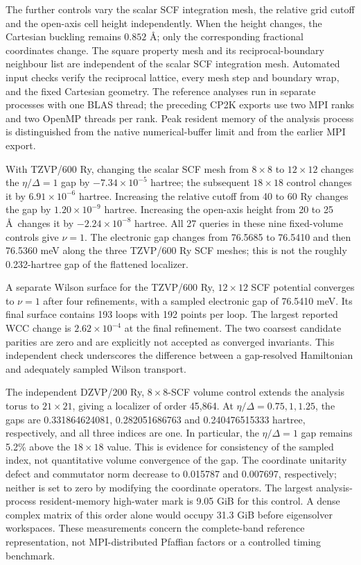 \documentclass[11pt]{article}
\begin{document}


The further controls vary the scalar SCF integration mesh, the
relative grid cutoff and the open-axis cell height independently.
When the height changes, the Cartesian buckling remains
$0.852$ \AA; only the corresponding fractional coordinates change.
The square property mesh and its reciprocal-boundary neighbour
list are independent of the scalar SCF integration mesh.
Automated input checks verify the reciprocal lattice, every mesh
step and boundary wrap, and the fixed Cartesian geometry.
The reference analyses run in separate processes with one BLAS
thread; the preceding CP2K exports use two MPI ranks and two
OpenMP threads per rank. Peak resident memory of the analysis
process is distinguished from the native numerical-buffer limit
and from the earlier MPI export.

With TZVP/600 Ry, changing the scalar SCF mesh from $8\times8$
to $12\times12$ changes the $\eta/\Delta=1$ gap by
$-7.34\times10^{-5}$ hartree; the subsequent $18\times18$
control changes it by $6.91\times10^{-6}$ hartree. Increasing
the relative cutoff from 40 to 60 Ry changes the gap by
$1.20\times10^{-9}$ hartree. Increasing the open-axis height
from 20 to 25 \AA\ changes it by $-2.24\times10^{-8}$ hartree.
All 27 queries in these nine fixed-volume controls give $\nu=1$.
The electronic gap changes from 76.5685 to 76.5410 and then
76.5360 meV along the three TZVP/600 Ry SCF meshes; this is
not the roughly 0.232-hartree gap of the flattened localizer.

A separate Wilson surface for the TZVP/600 Ry, $12\times12$
SCF potential converges to $\nu=1$ after four refinements,
with a sampled electronic gap of 76.5410 meV. Its final surface
contains 193 loops with 192 points per loop. The largest reported
WCC change is $2.62\times10^{-4}$ at the final refinement.
The two coarsest candidate parities are zero and are explicitly
not accepted as converged invariants. This independent check
underscores the difference between a gap-resolved Hamiltonian
and adequately sampled Wilson transport.

The independent DZVP/200 Ry, $8\times8$-SCF volume control
extends the analysis torus to $21\times21$, giving a localizer
of order 45,864. At $\eta/\Delta=0.75,1,1.25$, the gaps are
0.331864624081, 0.282051686763 and 0.240476515333 hartree,
respectively, and all three indices are one. In particular, the
$\eta/\Delta=1$ gap remains 5.2\% above the $18\times18$
value. This is evidence for consistency of the sampled index,
not quantitative volume convergence of the gap. The coordinate
unitarity defect and commutator norm decrease to 0.015787 and
0.007697, respectively; neither is set to zero by modifying the
coordinate operators.
The largest analysis-process resident-memory high-water mark is
9.05 GiB for this control. A dense complex matrix of this order
alone would occupy 31.3 GiB before eigensolver workspaces.
These measurements concern the complete-band reference representation,
not MPI-distributed Pfaffian factors or a controlled timing benchmark.
\end{document}
